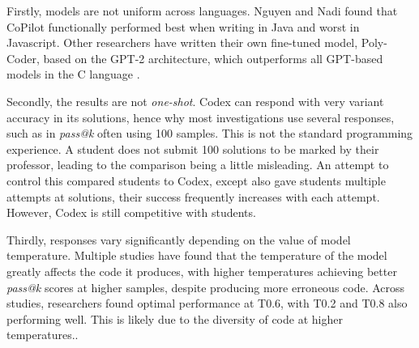 \documentclass[manuscript,screen,review,sigconf]{acmart}
\begin{document}
Firstly, models are not uniform across languages. Nguyen and Nadi \cite{CopilotSuggestionsEval} found that CoPilot functionally performed best when writing in Java and worst in Javascript. Other researchers have written their own fine-tuned model, Poly-Coder, based on the GPT-2 architecture, which outperforms all GPT-based models in the C language \cite{SysEvaOfLLMofCode}. 

Secondly, the results are not \textit{one-shot}. Codex can respond with very variant accuracy in its solutions, hence why most investigations use several responses, such as in \textit{pass@k} often using 100 samples. This is not the standard programming experience. A student does not submit 100 solutions to be marked by their professor, leading to the comparison being a little misleading. An attempt to control this compared students to Codex, except also gave students multiple attempts at solutions, their success frequently increases with each attempt. However, Codex is still competitive with students\cite{Codex_CS1_CS2_Test}. 

Thirdly, responses vary significantly depending on the value of model temperature. Multiple studies have found that the temperature of the model greatly affects the code it produces, with higher temperatures achieving better \textit{pass@k} scores at higher samples, despite producing more erroneous code. Across studies, researchers found optimal performance at T0.6, with T0.2 and T0.8 also performing well. This is likely due to the diversity of code at higher temperatures.\cite{stackOVerflowAndTemperature, SysEvaOfLLMofCode, CodexRelPaper}.
\end{document}
